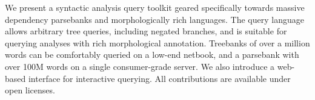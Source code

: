 We present a syntactic analysis query toolkit geared specifically towards massive dependency parsebanks and morphologically rich languages. The query language allows arbitrary tree queries, including negated branches, and is suitable for querying analyses with rich morphological annotation. Treebanks of over a million words can be comfortably queried on a low-end netbook, and a parsebank with over 100M words on a single consumer-grade server. We also introduce a web-based interface for interactive querying. All contributions are available under open licenses.
